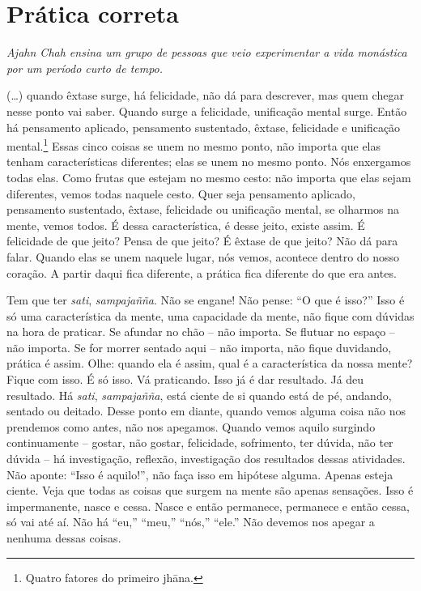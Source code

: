 
\chapter{Prática correta}

{\itshape
Ajahn Chah ensina um grupo de pessoas que veio experimentar a vida
monástica por um período curto de tempo.}

(…) quando êxtase surge, há felicidade, não dá para descrever, mas
quem chegar nesse ponto vai saber. Quando surge a felicidade,
unificação mental surge. Então há pensamento aplicado, pensamento
sustentado, êxtase, felicidade e unificação mental.\footnote{Quatro
fatores do primeiro jhāna.} Essas cinco coisas se unem no mesmo
ponto, não importa que elas tenham características diferentes; elas se
unem no mesmo ponto. Nós enxergamos todas elas. Como frutas que estejam
no mesmo cesto: não importa que elas sejam diferentes, vemos todas
naquele cesto. Quer seja pensamento aplicado, pensamento sustentado,
êxtase, felicidade ou unificação mental, se olharmos na mente, vemos
todos. É dessa característica, é desse jeito, existe assim. É
felicidade de que jeito? Pensa de que jeito? É êxtase de que jeito? Não
dá para falar. Quando elas se unem naquele lugar, nós vemos, acontece
dentro do nosso coração. A partir daqui fica diferente, a prática fica
diferente do que era antes.

Tem que ter \textit{sati}, \textit{sampajañña}. Não se engane! Não
pense: “O que é isso?” Isso é só uma característica da mente, uma
capacidade da mente, não fique com dúvidas na hora de praticar. Se
afundar no chão – não importa. Se flutuar no espaço – não importa. Se
for morrer sentado aqui – não importa, não fique duvidando, prática é
assim. Olhe: quando ela é assim, qual é a característica da nossa
mente? Fique com isso. É só isso. Vá praticando. Isso já é dar
resultado. Já deu resultado. Há \textit{sati}, \textit{sampajañña},
está ciente de si quando está de pé, andando, sentado ou deitado. Desse
ponto em diante, quando vemos alguma coisa não nos prendemos como
antes, não nos apegamos. Quando vemos aquilo surgindo continuamente –
gostar, não gostar, felicidade, sofrimento, ter dúvida, não ter dúvida
– há investigação, reflexão, investigação dos resultados dessas
atividades. Não aponte: “Isso é aquilo!”, não faça isso em hipótese
alguma. Apenas esteja ciente. Veja que todas as coisas que surgem na
mente são apenas sensações. Isso é impermanente, nasce e cessa. Nasce e
então permanece, permanece e então cessa, só vai até aí. Não há “eu,”
“meu,” “nós,” “ele.” Não devemos nos apegar a nenhuma dessas coisas. 

